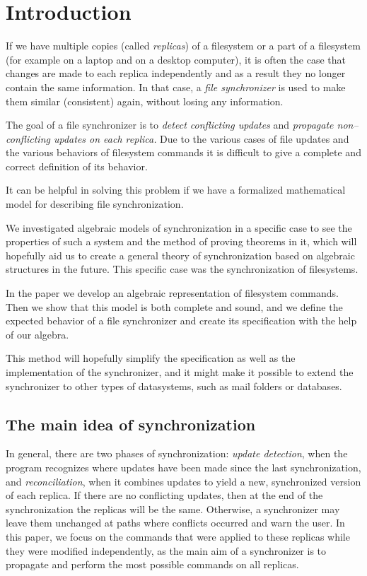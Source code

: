\section{Introduction}

If we have multiple copies (called \emph{replicas}) of a filesystem or a
part of a filesystem (for example on a laptop and on a desktop
computer), it is often the case that changes are made to each
replica independently and as a result they no longer contain the same
information. In that case, a \emph{file synchronizer} is used to make them
similar (consistent) again, without losing any information.

The goal of a file synchronizer is to \emph{detect conflicting updates}
and \emph{propagate non--conflicting updates on each replica.} Due to the
various cases of file updates and the various behaviors of filesystem
commands it is difficult to give a complete and correct definition of its
behavior.

It can be helpful in solving this problem if we have a
formalized mathematical model for describing file synchronization.

We investigated algebraic models of synchronization in a specific case to
see the properties of such a system and the method of proving theorems in
it, which will hopefully aid us to create a general theory of
synchronization based on algebraic structures in the future. This specific
case was the synchronization of filesystems.

In the paper we develop an algebraic representation of filesystem
commands. Then we show that this model is both complete and sound,
and we define the expected behavior of a file synchronizer and
create its specification with the help of our algebra. 

This method will
hopefully simplify the specification as well as the implementation of the
synchronizer, and it might make it possible to extend the synchronizer to
other types of datasystems, such as mail folders or databases.

\subsection{The main idea of synchronization}

In general, there are two phases of synchronization:
\emph{update detection}, when the program recognizes where updates have
been made since the last synchronization, and \emph{reconciliation}, when
it combines updates to yield a new, synchronized version of each replica.
If there are no conflicting updates, then at the end of the
synchronization the replicas will be the same. Otherwise, a synchronizer
may leave them unchanged at paths where conflicts occurred and warn the
user.
In this paper,
we focus on the commands that were applied to these replicas while they
were modified independently, as the main aim of a synchronizer is to
propagate and perform
the most possible commands on all replicas.

